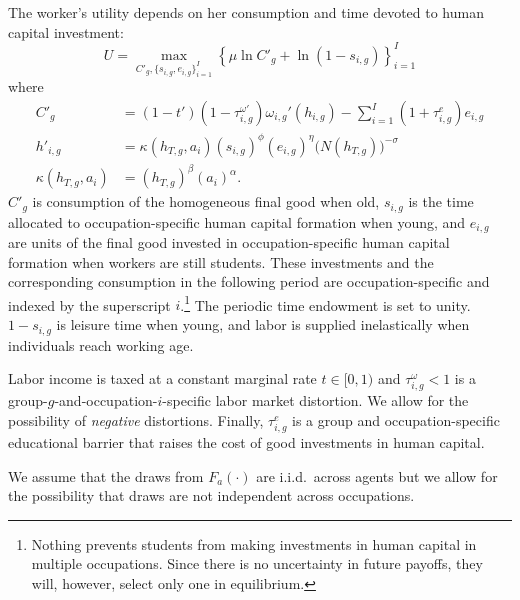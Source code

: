 \documentclass[onehalfspacing,11pt]{article}
\begin{document}
	The worker's utility depends on her consumption and time devoted to human capital investment:
	\begin{equation}
		U = \max_{C'_{g},\{s_{i,g},e_{i,g}\}_{i=1}^I} \left\{\mu \ln C'_{g} + \ln\left(1-s_{i,g} \right) \label{eq:util} \right\}_{i=1}^I
	\end{equation}
	where
	\begin{align}
		\label{}
		C'_{g} & =(1-t')(1-\tau^{\omega '}_{i,g})\omega_{i,g}'(h_{i,g})- \sum_{i=1}^I(1+\tau^e_{i,g})e_{i,g} \label{eq:bc}\\ %
		h'_{i,g} & =\kappa(h_{T,g},a_i)(s_{i,g})^{\phi} (e_{i,g})^{\eta}\big(N(h_{T,g})\big)^{-\sigma} \label{eq:h}\\
		\kappa(h_{T,g},a_i) & =(h_{T,g})^\beta \left(a_i \right)^\alpha. \label{eq:g(h,a)}
	\end{align}
	$C'_{g}$ is consumption of the homogeneous final good when old, $s_{i,g}$ is the time allocated to occupation-specific human capital formation when young, and $e_{i,g}$ are units of the final good invested in occupation-specific human capital formation when workers are still students. These investments and the corresponding consumption in the following period are occupation-specific and indexed by the superscript $i$.\footnote{Nothing prevents students from making investments in human capital in multiple occupations. Since there is no uncertainty in future payoffs, they will, however, select only one in equilibrium.} The periodic time endowment is set to unity. $1-s_{i,g}$ is leisure time when young, and labor is supplied inelastically when individuals reach working age.
	
	Labor income is taxed at a constant marginal rate $t \in [0,1)$ and $\tau^\omega_{i,g} < 1$ is a group-$g$-and-occupation-$i$-specific labor market distortion. We allow for the possibility of {\it negative} distortions. Finally, $\tau^e_{i,g}$ is a group and occupation-specific educational barrier that raises the cost of good investments in human capital.
	
	
	We assume that the draws from $F_a \left( \cdot \right)$ are i.i.d.~across agents but we allow for the possibility that draws are not independent across occupations.
	
\end{document}
